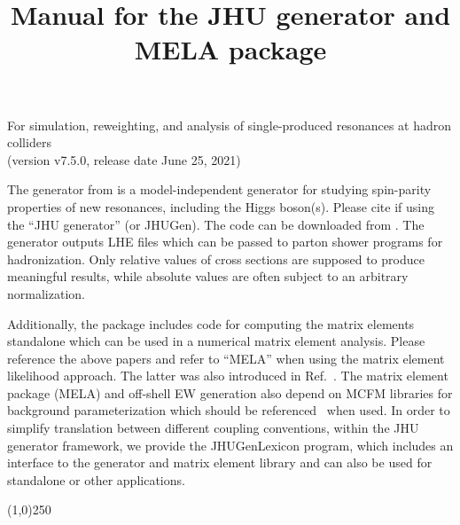 \documentclass[aps,superscriptaddress,nofootinbib]{revtex4}
\begin{document}
\vspace{0.6cm}

\title{
\large
Manual for the JHU generator and MELA package
}
\maketitle
\begin{center}
\small
For simulation, reweighting, and analysis of single-produced resonances at hadron colliders \\
(version v7.5.0, release date June 25, 2021) \\
\normalsize
\end{center}

\noindent
The generator from \cite{Gao:2010qx,Bolognesi:2012,Anderson:2013,Gritsan:2016hjl,Gritsan:2020pib,Martini:2021uey} 
is a model-independent generator for studying spin-parity properties of new resonances, including the Higgs boson(s). 
Please cite \cite{Gao:2010qx,Bolognesi:2012,Anderson:2013,Gritsan:2016hjl,Gritsan:2020pib,Martini:2021uey} 
if using the ``JHU generator'' (or JHUGen). The code can be downloaded from \cite{thesite}.
The generator outputs LHE files which can be passed to parton shower programs for hadronization.
Only relative values of cross sections are supposed to produce meaningful results, 
while absolute values are often subject to an arbitrary normalization.

Additionally, the package includes code for computing the matrix elements standalone which can be used in a numerical matrix element analysis.
Please reference the above papers and refer to ``MELA'' when using the matrix element likelihood approach.
The latter was also introduced in Ref.~\cite{Chatrchyan:2012ufa}. The matrix element package (MELA) and off-shell EW generation 
also depend on MCFM libraries for background parameterization which should be referenced~\cite{Campbell:2010ff} when used.
In order to simplify translation between different coupling conventions, within the JHU generator framework, we provide the JHUGenLexicon program,
which includes an interface to the generator and matrix element library and can also be used for standalone or other applications. 


\vspace{0.5cm}
\begin{center}
\line(1,0){250}
\end{center}
\vspace{0.5cm}
\tableofcontents
\begin{center}
\end{center}
\vspace{0.5cm}
\end{document}
